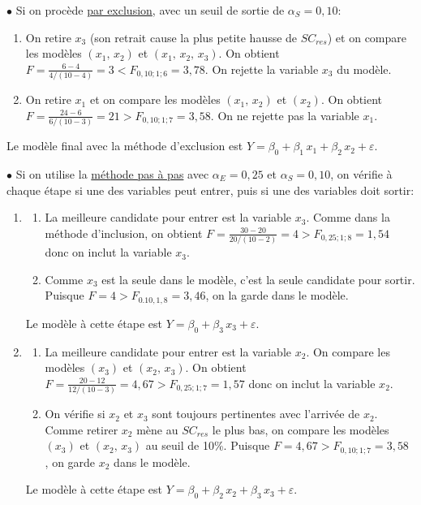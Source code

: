 \begin{exemple}
$\bullet$ Si on procède \underline{par exclusion}, avec un seuil de sortie de $\alpha_S=0,10$:
\begin{enumerate}
  \item On retire $x_3$ (son retrait cause la plus petite hausse de $SC_{res}$) et on compare les modèles $(x_1,\,x_2)$ et $(x_1,\,x_2,\,x_3)$. On obtient $F=\frac{6-4}{4/(10-4)}=3 < F_{0,10;1;6}=3,78$. On rejette la variable $x_3$ du modèle.
  \item On retire $x_1$ et on compare les modèles $(x_1,\,x_2)$ et $(x_2)$. On obtient $F=\frac{24-6}{6/(10-3)}=21>F_{0,10;1;7}=3,58$. On ne rejette pas la variable $x_1$.
\end{enumerate}

Le modèle final avec la  méthode d'exclusion est $Y=\beta_0+\beta_1\,x_1+\beta_2\,x_2 +\varepsilon$.

\newpage
$\bullet$ Si on utilise la \underline{méthode pas à pas} avec $\alpha_E=0,25$ et $\alpha_S=0,10$, on vérifie à chaque étape si une des variables peut entrer, puis si une des variables doit sortir:
    \begin{enumerate}
    \item
        \begin{enumerate}[label=$\bullet$]
        \item La meilleure candidate pour entrer est la variable $x_3$. Comme dans la méthode d'inclusion, on obtient $F=\frac{30-20}{20/(10-2)}=4>F_{0,25;1;8}=1,54$ donc on inclut la variable $x_3$.
        \item Comme $x_3$ est la seule dans le modèle, c'est la seule candidate pour sortir. Puisque $F=4> F_{0.10,1,8}=3,46$, on la garde dans le modèle.
        \end{enumerate}
         Le modèle à cette étape est $Y=\beta_0+\beta_3\,x_3+\varepsilon$.

    \item
        \begin{enumerate}[label=$\bullet$]
        \item La meilleure candidate pour entrer est la variable $x_2$. On compare les modèles $(x_3)$ et $(x_2,\,x_3)$. On obtient $F=\frac{20-12}{12/(10-3)}=4,67>F_{0,25;1;7}=1,57$ donc on inclut la variable $x_2$.
        \item On vérifie si $x_2$ et $x_3$ sont toujours pertinentes avec l'arrivée de $x_2$. Comme retirer $x_2$ mène au $SC_{res}$ le plus bas, on compare les modèles $(x_3)$ et $(x_2,\,x_3)$ au seuil de 10\%. Puisque $F=4,67>F_{0,10;1;7}=3,58$ , on garde $x_2$ dans le modèle.
        \end{enumerate}
        Le modèle à cette étape est $Y=\beta_0+\beta_2\,x_2+\beta_3\,x_3+\varepsilon$.


\end{enumerate}
\end{exemple}
